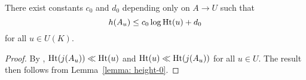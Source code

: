 \begin{lemma} \label{lemma:height}
		There exist constants $c_0$ and $d_0$ depending only on $A \to U$ such that
		\[
			h(A_u) \le c_0 \log \operatorname{Ht}(u) + d_0
		\]
		for all $u \in U(K)$.
	\end{lemma}
	\begin{proof}
	By \cite[p.~19, Section 2.6, Theorem]{serre1989lectures},
$\operatorname{Ht}(j(A_u)) \ll \operatorname{Ht}(u)$ and $\operatorname{Ht}(u) \ll \operatorname{Ht}(j(A_u))$ for all $u \in U$. The result then follows from Lemma~\ref{lemma: height-0}.
    \end{proof}
